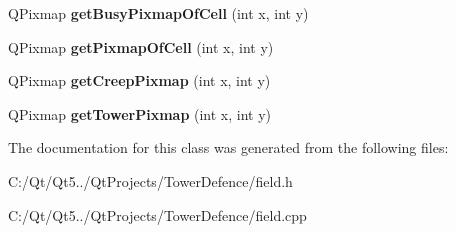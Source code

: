 \begin{DoxyCompactItemize}
\item 
\hypertarget{class_field_a34c1056ceddce629c5b457209c287c10}{}Q\+Pixmap {\bfseries get\+Busy\+Pixmap\+Of\+Cell} (int x, int y)\label{class_field_a34c1056ceddce629c5b457209c287c10}

\item 
\hypertarget{class_field_aa0a00e1c5e2c54cc23c048c89e018ac5}{}Q\+Pixmap {\bfseries get\+Pixmap\+Of\+Cell} (int x, int y)\label{class_field_aa0a00e1c5e2c54cc23c048c89e018ac5}

\item 
\hypertarget{class_field_ae4ef38aa9be364d1f7fe452d278610f8}{}Q\+Pixmap {\bfseries get\+Creep\+Pixmap} (int x, int y)\label{class_field_ae4ef38aa9be364d1f7fe452d278610f8}

\item 
\hypertarget{class_field_ab486ee0916144d59fbb50cef7a68d037}{}Q\+Pixmap {\bfseries get\+Tower\+Pixmap} (int x, int y)\label{class_field_ab486ee0916144d59fbb50cef7a68d037}

\end{DoxyCompactItemize}


The documentation for this class was generated from the following files\+:\begin{DoxyCompactItemize}
\item 
C\+:/\+Qt/\+Qt5../\+Qt\+Projects/\+Tower\+Defence/field.\+h\item 
C\+:/\+Qt/\+Qt5../\+Qt\+Projects/\+Tower\+Defence/field.\+cpp\end{DoxyCompactItemize}
